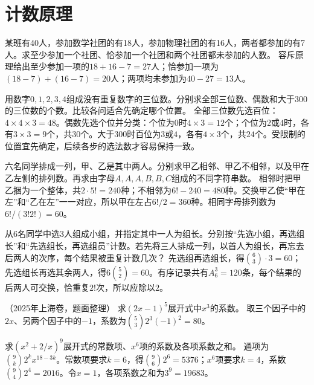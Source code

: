 \par\addvspace{12pt}

\section{计数原理}

某班有40人，参加数学社团的有18人，参加物理社团的有16人，两者都参加的有7人。求至少参加一个社团、恰参加一个社团和两个社团都未参加的人数。
\solutionanswer
容斥原理给出至少参加一项的\(18+16-7=27\)人；恰参加一项为\((18-7)+(16-7)=20\)人；两项均未参加为\(40-27=13\)人。


用数字\(0,1,2,3,4\)组成没有重复数字的三位数。分别求全部三位数、偶数和大于300的三位数的个数。比较各问适合先确定哪个位置。
\solutionanswer
全部三位数先选百位：\(4\times4\times3=48\)。偶数先选个位并分类：个位为\(0\)时\(4\times3=12\)个；个位为\(2\)或\(4\)时，各有\(3\times3=9\)个，共\(30\)个。大于300时百位为\(3\)或\(4\)，各有\(4\times3\)个，共\(24\)个。受限制的位置宜先确定，后续各步的选法数才容易保持一致。


六名同学排成一列，甲、乙是其中两人。分别求甲乙相邻、甲乙不相邻，以及甲在乙左侧的排列数。再求由字母\(A,A,A,B,B,C\)组成的不同字符串数。
\solutionanswer
相邻时把甲乙捆为一个整体，共\(2\cdot5!=240\)种；不相邻为\(6!-240=480\)种。交换甲乙使“甲在左”和“乙在左”一一对应，所以甲在左占\(6!/2=360\)种。相同字母排列数为\(6!/(3!2!)=60\)。


从6名同学中选3人组成小组，并指定其中一人为组长。分别按“先选小组，再选组长”和“先选组长，再选组员”计数。若先将三人排成一列，以首人为组长，再忘去后两人的次序，每个结果被重复计数几次？
\solutionanswer
先选组再选组长，得\(\binom63\cdot3=60\)；先选组长再选其余两人，得\(6\binom52=60\)。有序记录共有\(A_6^3=120\)条，每个结果的后两人可交换，恰重复\(2!\)次，所以应除以\(2\)。


（2025年上海卷，题面整理）
求\((2x-1)^5\)展开式中\(x^3\)的系数。
\solutionanswer
取三个因子中的\(2x\)、另两个因子中的\(-1\)，系数为\(\binom53 2^3(-1)^2=80\)。


求\((x^2+2/x)^9\)展开式的常数项、\(x^6\)项的系数及各项系数之和。
\solutionanswer
通项为\(\binom9k2^kx^{18-3k}\)。常数项要求\(k=6\)，得\(\binom962^6=5376\)；\(x^6\)项要求\(k=4\)，系数\(\binom942^4=2016\)。令\(x=1\)，各项系数之和为\(3^9=19683\)。


